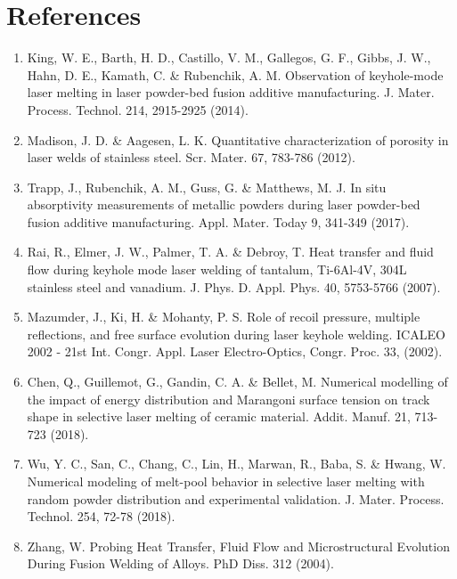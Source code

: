 \documentclass[10pt]{article}
\begin{document}
\section*{References}
\begin{enumerate}
  \item King, W. E., Barth, H. D., Castillo, V. M., Gallegos, G. F., Gibbs, J. W., Hahn, D. E., Kamath, C. \& Rubenchik, A. M. Observation of keyhole-mode laser melting in laser powder-bed fusion additive manufacturing. J. Mater. Process. Technol. 214, 2915-2925 (2014).

  \item Madison, J. D. \& Aagesen, L. K. Quantitative characterization of porosity in laser welds of stainless steel. Scr. Mater. 67, 783-786 (2012).

  \item Trapp, J., Rubenchik, A. M., Guss, G. \& Matthews, M. J. In situ absorptivity measurements of metallic powders during laser powder-bed fusion additive manufacturing. Appl. Mater. Today 9, 341-349 (2017).

  \item Rai, R., Elmer, J. W., Palmer, T. A. \& Debroy, T. Heat transfer and fluid flow during keyhole mode laser welding of tantalum, Ti-6Al-4V, 304L stainless steel and vanadium. J. Phys. D. Appl. Phys. 40, 5753-5766 (2007).

  \item Mazumder, J., Ki, H. \& Mohanty, P. S. Role of recoil pressure, multiple reflections, and free surface evolution during laser keyhole welding. ICALEO 2002 - 21st Int. Congr. Appl. Laser Electro-Optics, Congr. Proc. 33, (2002).

  \item Chen, Q., Guillemot, G., Gandin, C. A. \& Bellet, M. Numerical modelling of the impact of energy distribution and Marangoni surface tension on track shape in selective laser melting of ceramic material. Addit. Manuf. 21, 713-723 (2018).

  \item Wu, Y. C., San, C., Chang, C., Lin, H., Marwan, R., Baba, S. \& Hwang, W. Numerical modeling of melt-pool behavior in selective laser melting with random powder distribution and experimental validation. J. Mater. Process. Technol. 254, 72-78 (2018).

  \item Zhang, W. Probing Heat Transfer, Fluid Flow and Microstructural Evolution During Fusion Welding of Alloys. PhD Diss. 312 (2004).


\end{enumerate}
\end{document}
